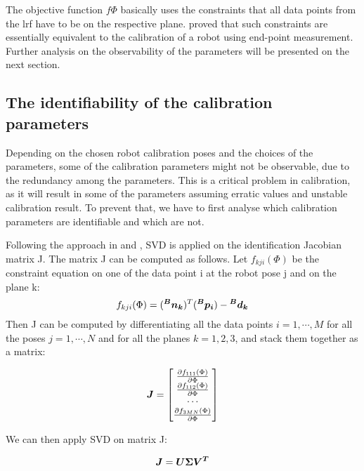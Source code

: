 The objective function $f{\Phi}$ basically uses the constraints that all data points from the \ac{lrf} have to be on the respective plane. \cite{Zhuang1999} proved that such constraints are essentially equivalent to the calibration of a robot using end-point measurement. Further analysis on the observability of the parameters will be presented on the next section. 

\subsection{The identifiability of the calibration parameters}
\label{sec:third_step}

Depending on the chosen robot calibration poses and the choices of the parameters, some of the calibration parameters might not be observable, due to the redundancy among the parameters. This is a critical problem in calibration, as it will result in some of the parameters assuming erratic values and unstable calibration result. To prevent that, we have to first analyse which calibration parameters are identifiable and which are not. 

Following the approach in \cite{Hollerbach1996} and \cite{Joubair2015}, SVD is applied on the identification Jacobian matrix J. The matrix J can be computed as follows. Let  $f_{kji}(\Phi)$ be the constraint equation on one of the data point i at the robot pose j and on the plane k:
\begin{equation}
 f_{kji}(\Phi) =  (\vb*{{^B}n_k}) ^T (\vb*{{^B}p_i}) - \vb*{{^B}d_k}
\end{equation}
Then J can be computed by differentiating all the data points $i = 1, \cdots, M$ for all the poses $j = 1, \cdots, N$ and for all the planes $k=1,2,3$, and stack them together as a matrix:

\renewcommand\arraystretch{1.5}
\begin{equation}
\vb*{J} = \begin{bmatrix}
 \frac{\partial f_{111}(\Phi)}{\partial\Phi}\\
 \frac{\partial f_{112}(\Phi)}{\partial\Phi}\\
 \cdots \\
 \frac{\partial f_{3MN}(\Phi)}{\partial\Phi}\\
	\end{bmatrix}
\end{equation}

We can then apply SVD on matrix J:

\begin{equation}
 \vb*{J} = \vb*{U}\vb*{\Sigma}\vb*{V^T}
\end{equation}

